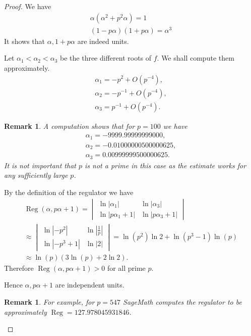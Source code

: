 \documentclass[a4paper]{article}
\newtheorem{Rem}[Thm]{Remark}
\DeclareMathOperator{\Reg}{Reg}        %
\begin{document}
\begin{proof}
We have
\begin{gather}
\alpha (\alpha ^2 + p^2 \alpha) = 1
\\
(1 - p \alpha)(1 + p \alpha) = \alpha^3
\end{gather}
It shows that $\alpha, 1 + p \alpha$ are indeed units.

Let $\alpha_1 < \alpha_2 < \alpha_3 $ be the three different roots of $f$.
We shall compute them approximately.
\begin{gather*}
\alpha_1 = -p^2 + O\left(p^{-4} \right), \\
\alpha_2 = - p^{-1}   + O\left(p^{-4} \right), \\
\alpha_3 = p^{-1} + O\left(p^{-4} \right)
.\end{gather*}

\begin{Rem}
A computation shows that for $p = 100$ we have
\begin{gather*}
\alpha_1 = -9999.99999999000 , \\
\alpha_2 = -0.01000000500000625, \\
\alpha_3 = 0.00999999500000625
.\end{gather*}
It is not important that $p$ is not a prime in this case as the estimate works for any sufficiently large $p$.
\end{Rem}

By the definition of the regulator we have
\begin{multline}
\Reg(\alpha, p\alpha + 1) = 
\begin{vmatrix}
\ln |\alpha_1| 		& \ln |\alpha_3| \\
\ln |p \alpha_1 + 1| 	& \ln |p \alpha_3 + 1|
\end{vmatrix} 
\\
\approx
\begin{vmatrix}
\ln |-p^2| 	& \ln |\frac{1}{p}| \\
\ln |-p^3 + 1| 	& \ln |2|
\end{vmatrix}
=
\ln(p^2)
\ln 2
+
\ln(p^3 - 1) \ln(p)
\\
\approx \ln(p) ( 3 \ln(p) + 2 \ln 2 )
.\end{multline}
Therefore $ \Reg(\alpha, p\alpha + 1) > 0 $ for all prime $p$.

Hence $\alpha, p\alpha + 1$ are independent units. 

\begin{Rem}
For example, for $p = 547$ SageMath computes the regulator to be approximately $\Reg = 127.978045931846$.


\end{Rem}
\end{proof}
\end{document}
